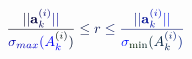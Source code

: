 \documentclass[12pt]{article}
\begin{document}
\makeatletter
\renewcommand*{\@textcolor}[3]{%
  \protect\leavevmode
  \begingroup
    \color#1{#2}#3%
  \endgroup
}
\makeatother
\begin{displaymath}
\mathcolor[RGB]{0,0,15}{\frac { \mathcolor[RGB]{0,0,30}{|} \mathcolor[RGB]{0,0,45}{|} \mathbf { \mathcolor[RGB]{0,0,60}{a} } _ { \mathcolor[RGB]{0,0,75}{k} } ^ { \mathcolor[RGB]{0,0,90}{(} \mathcolor[RGB]{0,0,105}{i} \mathcolor[RGB]{0,0,120}{)} } \mathcolor[RGB]{0,0,135}{|} \mathcolor[RGB]{0,0,150}{|} } { \mathcolor[RGB]{0,0,165}{\sigma} _ { \mathcolor[RGB]{0,0,180}{m} \mathcolor[RGB]{0,0,195}{a} \mathcolor[RGB]{0,0,210}{x} } \mathcolor[RGB]{0,0,225}{(} \mathcolor[RGB]{0,0,240}{A} _ { \mathcolor[RGB]{0,0,255}{k} } ^ { \mathcolor[RGB]{0,15,0}{(} \mathcolor[RGB]{0,15,15}{i} \mathcolor[RGB]{0,15,30}{)} } \mathcolor[RGB]{0,15,45}{)} } } \mathcolor[RGB]{0,15,60}{\leq} \mathcolor[RGB]{0,15,75}{r} \mathcolor[RGB]{0,15,90}{\leq} \mathcolor[RGB]{0,15,105}{\frac { \mathcolor[RGB]{0,15,120}{|} \mathcolor[RGB]{0,15,135}{|} \mathbf { \mathcolor[RGB]{0,15,150}{a} } _ { \mathcolor[RGB]{0,15,165}{k} } ^ { \mathcolor[RGB]{0,15,180}{(} \mathcolor[RGB]{0,15,195}{i} \mathcolor[RGB]{0,15,210}{)} } \mathcolor[RGB]{0,15,225}{|} \mathcolor[RGB]{0,15,240}{|} } { \mathcolor[RGB]{0,15,255}{\sigma} _ { \mathrm { \mathcolor[RGB]{0,30,0}{m} \mathcolor[RGB]{0,30,15}{i} \mathcolor[RGB]{0,30,30}{n} } } \mathcolor[RGB]{0,30,45}{(} \mathcolor[RGB]{0,30,60}{A} _ { \mathcolor[RGB]{0,30,75}{k} } ^ { \mathcolor[RGB]{0,30,90}{(} \mathcolor[RGB]{0,30,105}{i} \mathcolor[RGB]{0,30,120}{)} } \mathcolor[RGB]{0,30,135}{)} } }
\end{displaymath}
\end{document}
